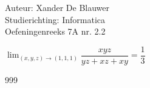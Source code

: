 \documentclass[a4paper]{article}
\begin{document}
\noindent \large Auteur: Xander De Blauwer \\
\noindent \large Studierichting: Informatica\\
\noindent \large Oefeningenreeks 7A nr. 2.2\\

\medskip

\normalsize

$\displaystyle \lim_{(x,y,z)\to(1,1,1)} \dfrac{xyz}{yz + xz + xy}= \dfrac{1}{3}$ \\



\begin{thebibliography}{999}
\end{thebibliography}
\end{document}

